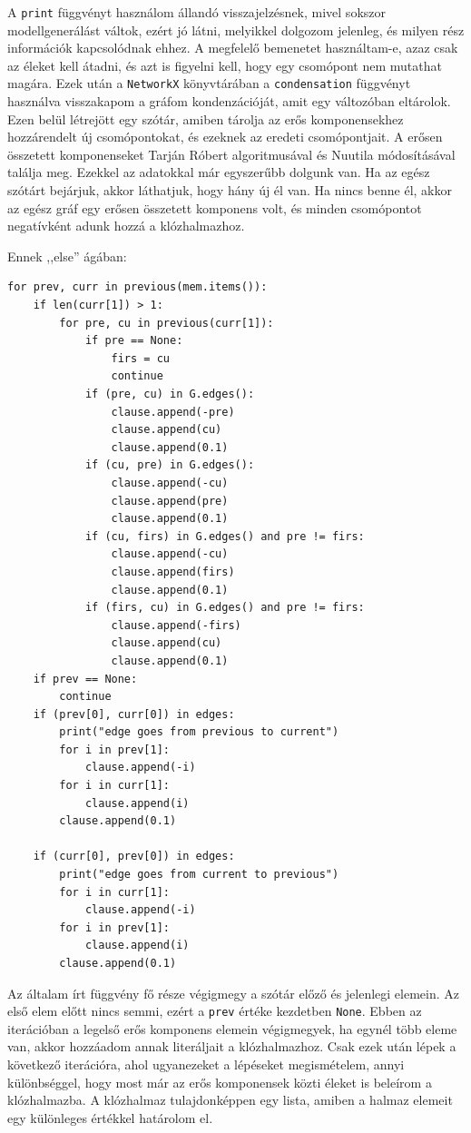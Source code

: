 \documentclass[
]{thesis-ekf}
\theoremstyle{definition}
\theoremstyle{remark}
\begin{document}
	A \texttt{print} függvényt használom állandó visszajelzésnek, mivel sokszor modellgenerálást váltok, ezért jó látni, melyikkel dolgozom jelenleg, és milyen rész információk kapcsolódnak ehhez. A megfelelő bemenetet használtam-e, azaz csak az éleket kell átadni, és azt is figyelni kell, hogy egy csomópont nem mutathat magára. Ezek után a \texttt{NetworkX} könyvtárában a \texttt{condensation} függvényt használva visszakapom a gráfom kondenzációját, amit egy változóban eltárolok. Ezen belül létrejött egy szótár, amiben tárolja az erős komponensekhez hozzárendelt új csomópontokat, és ezeknek az eredeti csomópontjait. A erősen összetett komponenseket Tarján Róbert algoritmusával \cite{tarjan} és Nuutila módosításával \cite{nuutila} találja meg. Ezekkel az adatokkal már egyszerűbb dolgunk van. Ha az egész szótárt bejárjuk, akkor láthatjuk, hogy hány új él van. Ha nincs benne él, akkor az egész gráf egy erősen összetett komponens volt, és minden csomópontot negatívként adunk hozzá a klózhalmazhoz.

	Ennek ,,else'' ágában:
	\begin{lstlisting}
for prev, curr in previous(mem.items()):
	if len(curr[1]) > 1:
		for pre, cu in previous(curr[1]):
			if pre == None:
				firs = cu
				continue
			if (pre, cu) in G.edges():
				clause.append(-pre)
				clause.append(cu)
				clause.append(0.1)
			if (cu, pre) in G.edges():
				clause.append(-cu)
				clause.append(pre)
				clause.append(0.1)
			if (cu, firs) in G.edges() and pre != firs:
				clause.append(-cu)
				clause.append(firs)
				clause.append(0.1)
			if (firs, cu) in G.edges() and pre != firs:
				clause.append(-firs)
				clause.append(cu)
				clause.append(0.1)
	if prev == None:
		continue
	if (prev[0], curr[0]) in edges:
		print("edge goes from previous to current")
		for i in prev[1]:
			clause.append(-i)
		for i in curr[1]:
			clause.append(i)
		clause.append(0.1)
	
	if (curr[0], prev[0]) in edges:
		print("edge goes from current to previous")
		for i in curr[1]:
			clause.append(-i)
		for i in prev[1]:
			clause.append(i)
		clause.append(0.1)
	\end{lstlisting}	
	
	Az általam írt függvény fő része végigmegy a szótár előző és jelenlegi elemein. Az első elem előtt nincs semmi, ezért a \texttt{prev} értéke kezdetben \texttt{None}. Ebben az iterációban a legelső erős komponens elemein végigmegyek, ha egynél több eleme van, akkor hozzáadom annak literáljait a klózhalmazhoz. Csak ezek után lépek a következő iterációra, ahol ugyanezeket a lépéseket megismételem, annyi különbséggel, hogy most már az erős komponensek közti éleket is beleírom a klózhalmazba. A klózhalmaz tulajdonképpen egy lista, amiben a halmaz elemeit egy különleges értékkel határolom el.
	
\end{document}
